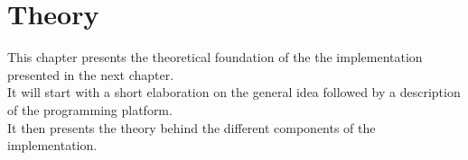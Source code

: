 \chapter{Theory}
\label{chap:theory}




















This chapter presents the theoretical foundation of the the implementation presented in the next chapter.\\
It will start with a short elaboration on the general idea followed by a description of the
programming platform.\\
It then presents the theory behind the different components of the implementation.

